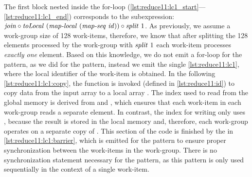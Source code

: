 The first block nested inside the for-loop (\autoref{lst:reduce11:lc1_start}---\autoref{lst:reduce11:lc1_end}) corresponds to the subexpression:
$\text{\textit{join}} \circ \text{\textit{toLocal}}\ (\text{\textit{map-local}}\ (\text{\textit{map-seq}}\ \text{\textit{id}})) \circ \text{\textit{split}}\ 1$.
As previously, we assume a work-group size of 128 work-items, therefore, we know that after splitting the 128 elements processed by the work-group with $\text{\textit{split}}\ 1$ each work-item processes \emph{exactly one} element.
Based on this knowledge, we do not emit a for-loop for the \mapLocal pattern, as we did for the \mapWorkgroup pattern, instead we emit the single \autoref{lst:reduce11:lc1}, where the local identifier of the work-item is obtained.
In the following \autoref{lst:reduce11:lc1:copy}, the  function is invoked (defined in \autoref{lst:reduce11:id}) to copy data from the input array to a local array .
The index used to read from the global memory is derived from  and , which ensures that each work-item in each work-group reads a separate element.
In contrast, the index for writing only uses , because the result is stored in the local memory and, therefore, each work-group operates on a separate copy of .
This section of the code is finished by the  in \autoref{lst:reduce11:lc1:barrier}, which is emitted for the \mapLocal pattern to ensure proper synchronization between the work-items in the work-group.
There is no synchronization statement necessary for the \mapSeq pattern, as this pattern is only used sequentially in the context of a single work-item.


